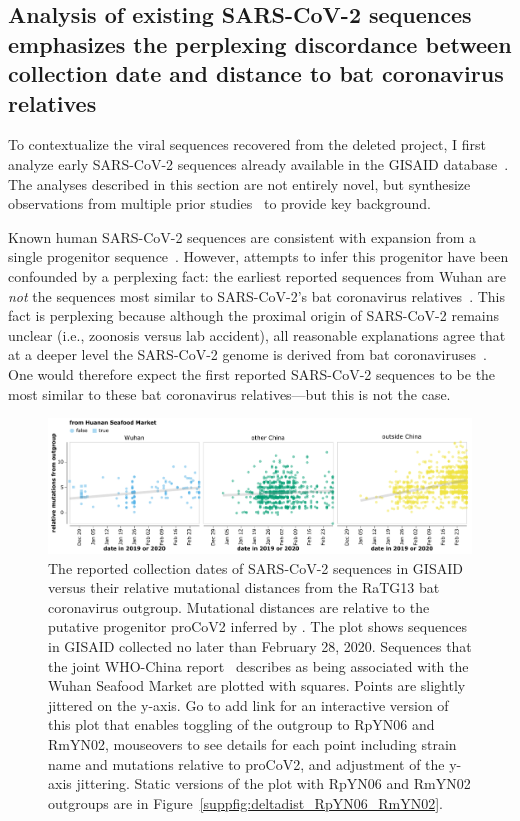 \documentclass[9pt,twocolumn,twoside]{gsajnl_modified}
\begin{document}
\subsection{Analysis of existing SARS-CoV-2 sequences emphasizes the perplexing discordance between collection date and distance to bat coronavirus relatives}
To contextualize the viral sequences recovered from the deleted project, I first analyze early SARS-CoV-2 sequences already available in the GISAID database~\citep{shu2017gisaid}.
The analyses described in this section are not entirely novel, but synthesize observations from multiple prior studies~\citep{kumar2021evolutionary,pekar2021timing,rambaut2020dynamic,forster2020phylogenetic,pipes2021assessing} to provide key background.

Known human SARS-CoV-2 sequences are consistent with expansion from a single progenitor sequence~\citep{kumar2021evolutionary,pekar2021timing,rambaut2020dynamic,forster2020phylogenetic,pipes2021assessing}.
However, attempts to infer this progenitor have been confounded by a perplexing fact: the earliest reported sequences from Wuhan are \emph{not} the sequences most similar to SARS-CoV-2's bat coronavirus relatives~\citep{pipes2021assessing}.
This fact is perplexing because although the proximal origin of SARS-CoV-2 remains unclear (i.e., zoonosis versus lab accident), all reasonable explanations agree that at a deeper level the SARS-CoV-2 genome is derived from bat coronaviruses~\citep{lytras2021exploring}.
One would therefore expect the first reported SARS-CoV-2 sequences to be the most similar to these bat coronavirus relatives---but this is not the case.

\begin{figure}
\centering
\includegraphics[width=\linewidth]{figures/deltadist_RaTG13.pdf}
\caption{The reported collection dates of SARS-CoV-2 sequences in GISAID versus their relative mutational distances from the RaTG13 bat coronavirus outgroup.
Mutational distances are relative to the putative progenitor proCoV2 inferred by \citet{kumar2021evolutionary}.
The plot shows sequences in GISAID collected no later than February 28, 2020.
Sequences that the joint WHO-China report~\citep{WHO2021origins} describes as being associated with the Wuhan Seafood Market are plotted with squares.
Points are slightly jittered on the y-axis.
Go to {\color{red} add link} for an interactive version of this plot that enables toggling of the outgroup to RpYN06 and RmYN02, mouseovers to see details for each point including strain name and mutations relative to proCoV2, and adjustment of the y-axis jittering.
Static versions of the plot with RpYN06 and RmYN02 outgroups are in Figure~\ref{suppfig:deltadist_RpYN06_RmYN02}.
}
\label{fig:deltadist_RaTG13}
\end{figure}
\end{document}
